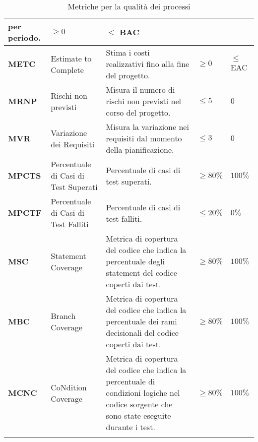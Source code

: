 \begin{longtable}{|C{1.5cm}|L{3cm}|L{4cm}|L{2.5cm}|L{2.5cm}|}
        per periodo. & $\geq 0  $ & $ \leq$ BAC  \\
        \hline
        \textbf{METC} & Estimate to Complete &  Stima i costi realizzativi fino alla fine del progetto. & $\geq 0  $ & $ \leq$ EAC  \\
        \hline
        \textbf{MRNP}    & Rischi non previsti   & Misura il numero di rischi non previsti nel corso del progetto. & $\leq 5$ &   $0$ \\
        \hline
        \textbf{MVR} & Variazione dei Requisiti & Misura la variazione nei requisiti dal momento della pianificazione. & $\leq 3$ & $0$ \\
        \hline
        \textbf{MPCTS} & Percentuale di Casi di Test Superati & Percentuale di casi di test superati. & $\geq 80\%$ & $100\%$ \\
        \hline
        \textbf{MPCTF} & Percentuale di Casi di Test Falliti & Percentuale di casi di test falliti. & $\leq 20\%$ & $0\%$ \\
        \hline
        \textbf{MSC} & Statement Coverage & Metrica di copertura del codice che indica la percentuale degli statement del codice coperti dai test. & $\geq 80\%$ & $100\%$ \\
        \hline
        \textbf{MBC} & Branch Coverage & Metrica di copertura del codice che indica la percentuale dei rami decisionali del codice coperti dai test. & $\geq 80\%$ & $100\%$ \\
        \hline
        \textbf{MCNC} & CoNdition Coverage & Metrica di copertura del codice che indica la percentuale di condizioni logiche nel codice sorgente che sono state eseguite durante i test. & $\geq 80\%$ & $100\%$ \\
        \hline
        \caption{Metriche per la qualità dei processi}
        \label{tab:qualità_processo_progetto}
        \end{longtable}